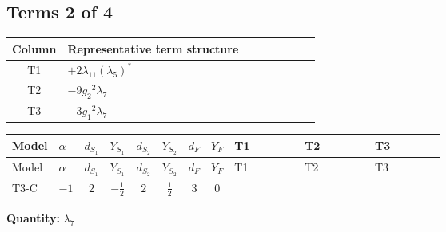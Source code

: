 \documentclass[8pt]{article}
\begin{document}
\begin{landscape}
\subsection*{Terms 2 of 4}
\begin{center}
\begin{tabular}{@{}c >{\raggedright\arraybackslash}p{0.82\linewidth}@{}}
\toprule
Column & Representative term structure \\
\midrule
T1 & \(\displaystyle +2 {\lambda_{11}} \left({\lambda_5}\right)^{*}\) \\
\midrule
T2 & \(\displaystyle -9 {g_2}^2 {\lambda_{7}}\) \\
\midrule
T3 & \(\displaystyle -3 {g_1}^2 {\lambda_{7}}\) \\
\midrule
\bottomrule
\end{tabular}
\end{center}
\smallskip
\tiny
\begin{longtable}{@{}llcccccc >{\raggedright\arraybackslash}p{0.21\linewidth} >{\raggedright\arraybackslash}p{0.21\linewidth} >{\raggedright\arraybackslash}p{0.21\linewidth}@{}}
\toprule
Model & $\alpha$ & $d_{S_1}$ & $Y_{S_1}$ & $d_{S_2}$ & $Y_{S_2}$ & $d_F$ & $Y_F$ & T1 & T2 & T3 \\
\midrule
\endfirsthead
\toprule
Model & $\alpha$ & $d_{S_1}$ & $Y_{S_1}$ & $d_{S_2}$ & $Y_{S_2}$ & $d_F$ & $Y_F$ & T1 & T2 & T3 \\
\midrule
\endhead
T3-C & $-1$ & $2$ & $-\frac{1}{2}$ & $2$ & $\frac{1}{2}$ & $3$ & $0$ & \scriptsize\adjustbox{max width=\linewidth}{$\begin{gathered} +2 {\lambda_{11}} \left({\lambda_5}\right)^{*}\end{gathered}$} & \scriptsize\adjustbox{max width=\linewidth}{$\begin{gathered} -9 {g_2}^2 {\lambda_{7}}\end{gathered}$} & \scriptsize\adjustbox{max width=\linewidth}{$\begin{gathered} -3 {g_1}^2 {\lambda_{7}}\end{gathered}$} \\
\midrule
\bottomrule
\end{longtable}
\clearpage
\noindent\textbf{Quantity: }$\lambda_{7}$\par\smallskip

\end{landscape}
\end{document}
